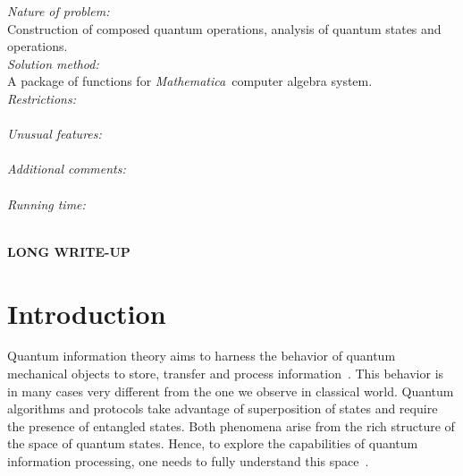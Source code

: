 \documentclass{elsart}
\newcommand{\Mathematica}{\emph{Mathematica}}
\newcommand{\1}{{\rm 1\hspace{-0.9mm}l}}
\begin{document}
\begin{small}
{\em Nature of problem:}\\
  Construction of composed quantum operations, analysis of quantum states and
  operations.
   \\
{\em Solution method:}\\
  A package of functions for \Mathematica\ computer algebra system.
   \\
{\em Restrictions:}\\
   \\
{\em Unusual features:}\\
   \\
{\em Additional comments:}\\
   \\
{\em Running time:}\\
   \\

\end{small}

\newpage


\hspace{1pc}
{\bf LONG WRITE-UP}


\tableofcontents


\section{Introduction}\label{sec:intro}
Quantum information theory aims to harness the behavior of quantum mechanical
objects to store, transfer and process information~\cite{hayashi}. This behavior
is in many cases very different from the one we observe in classical world.
Quantum algorithms and protocols take advantage of superposition of states and
require the presence of entangled states. Both phenomena arise from the rich
structure of the space of quantum states. Hence, to explore the capabilities of
quantum information processing, one needs to fully understand this
space~\cite{BZ06}. 
\end{document}
